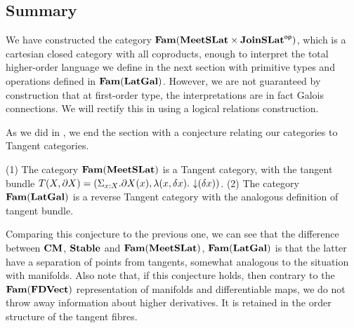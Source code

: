 \subsection{Summary}
\label{sec:models:summary}

We have constructed the category
$\mathbf{Fam}(\mathbf{MeetSLat} \times \mathbf{JoinSLat}^{\mathsf{op}})$, which is a cartesian closed
category with all coproducts, enough to interpret the total
higher-order language we define in the next section with primitive
types and operations defined in $\mathbf{Fam}(\mathbf{LatGal})$. However, we are not
guaranteed by construction that at first-order type, the
interpretations are in fact Galois connections. We will rectify this
in  using a logical relations construction.

As we did in , we end the section with a
conjecture relating our categories to Tangent categories.

\begin{conjecture}
  (1) The category $\mathbf{Fam}(\mathbf{MeetSLat})$ is a Tangent category, with the
  tangent bundle
  $T(X, \partial X) = (\Sigma_{x : X}. \partial X(x), \lambda (x,
  \delta x).\, \mathop{\downarrow}(\delta x))$. (2) The category $\mathbf{Fam}(\mathbf{LatGal})$
  is a reverse Tangent category with the analogous definition of
  tangent bundle.
\end{conjecture}

Comparing this conjecture to the previous one, we can see that the
difference between $\mathbf{CM}$, $\mathbf{Stable}$ and $\mathbf{Fam}(\mathbf{MeetSLat})$,
$\mathbf{Fam}(\mathbf{LatGal})$ is that the latter have a separation of points from
tangents, somewhat analogous to the situation with manifolds. Also
note that, if this conjecture holds, then contrary to the $\mathbf{Fam}(\mathbf{FDVect})$ representation of
manifolds and differentiable maps, we do
not throw away information about higher derivatives. It is retained in
the order structure of the tangent fibres.
